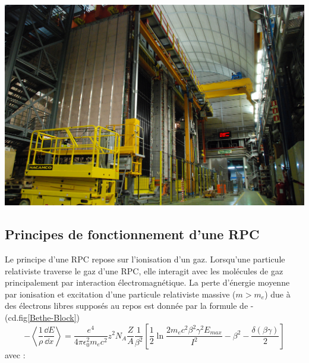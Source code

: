 \marginpar
{
	\centering
	\includegraphics[width=\marginparwidth]{RPC/OPERA.jpg}
	\label{opera}
}

\subsection{Principes de fonctionnement d'une RPC}
Le principe d'une RPC repose sur l'ionisation d'un gaz. Lorsqu'une particule relativiste traverse le gaz d'une RPC, elle interagit avec les molécules de gaz principalement par interaction électromagnétique. La perte d'énergie moyenne par ionisation et excitation d'une particule relativiste massive ($m>m_{e}$) due à des électrons libres supposés au repos est donnée par la formule de - (cd.fig\ref{Bethe-Block})
\begin{equation}
-\left<\frac{1}{\rho}\frac{\dd E}{\dd x}\right>=\frac{e^{4}}{4\pi \epsilon_{0}^{2}m_{e}c^{2}}z^{2}N_{A}\frac{Z}{A}\frac{1}{\beta^{2}}\left[\frac{1}{2}\ln\frac{2m_{e}c^{2}\beta^{2}\gamma^{2}E_{max}}{I^{2}}-\beta^{2}-\frac{\delta(\beta\gamma)}{2}\right]
\end{equation}
avec :

